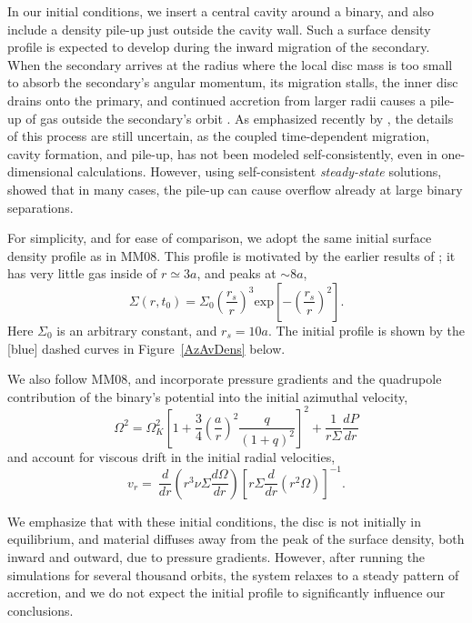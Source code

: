 In our initial conditions, we insert a central cavity around a binary,
and also include a density pile-up just outside the cavity wall.  Such
a surface density profile is expected to develop during the inward
migration of the secondary. When the secondary arrives at the radius
where the local disc mass is too small to absorb the secondary's
angular momentum, its migration stalls, the inner disc drains onto the
primary, and continued accretion from larger radii causes a pile-up of
gas outside the secondary's orbit
\citep{SyerClarke95,Ivanov99,Milos:Phinney:2005,Chang+2010,Rafikov2012}.
As emphasized recently by \citet{Kocsis+2012a}, the details of this
process are still uncertain, as the coupled time-dependent migration,
cavity formation, and pile-up, has not been modeled self-consistently,
even in one-dimensional calculations.  However, using self-consistent
{\em steady-state} solutions, \citet{Kocsis+2012b} showed that in many
cases, the pile-up can cause overflow already at large binary
separations.

For simplicity, and for ease of comparison, we adopt the same initial
surface density profile as in MM08. This profile is motivated by the
earlier results of \cite{Milos:Phinney:2005}; it has very little gas
inside of $r\simeq3a$, and peaks at $\sim 8a$,
%
\begin{equation}
\Sigma(r, t_0) = \Sigma_0 \left( \frac{r_s}{r} \right)^{3} \mbox{exp}\left[-\left(\frac{r_s}{r}\right)^2\right].
\label{Sig0}
\end{equation}
%
Here $\Sigma_0$ is an arbitrary constant, and $r_s=10a$. The initial
profile is shown by the [blue] dashed curves in Figure~\ref{AzAvDens}
below.

We also follow MM08, and incorporate pressure gradients and the
quadrupole contribution of the binary's potential into the initial
azimuthal velocity,
%
\begin{equation}
\Omega^2 = \Omega^2_K \left[ 1 + \frac{3}{4} \left(\frac{a}{r}\right)^2  \frac{q}{(1+q)^2}\right]^2 + \frac{1}{ r \Sigma } \frac{d P}{d r}
\end{equation}
%
and account for viscous drift in the initial radial velocities,
%
\begin{equation}
v_r =  \  \frac{d }{d r} \left( r^3 \nu \Sigma \frac{d \Omega}{dr} \right)  \left[r \Sigma \frac{d}{d r} \left( r^2 \Omega\right) \right]^{-1}.
\end{equation}

We emphasize that with these initial conditions, the disc is not initially in
equilibrium, and material diffuses away from the peak of the surface
density, both inward and outward, due to pressure gradients.  However,
after running the simulations for several thousand orbits, the system
relaxes to a steady pattern of accretion, and we do not expect the
initial profile to significantly influence our conclusions.



